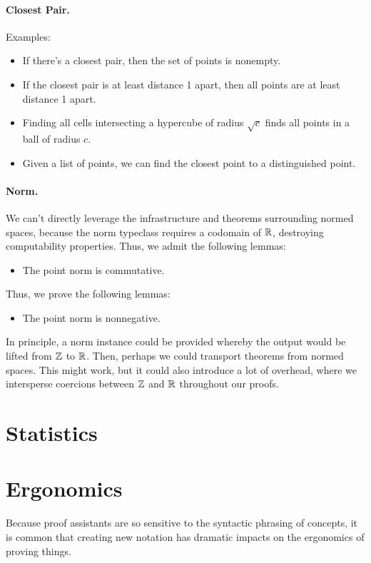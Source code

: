 \documentclass{article}
\begin{document}
\paragraph{Closest Pair.}
Examples:
\begin{itemize}
  \item If there's a closest pair, then the set of points is nonempty.
  \item If the closest pair is at least distance 1 apart, then all points are at least distance 1 apart.
  \item Finding all cells intersecting a hypercube of radius $\sqrt{c}$ finds all points in a ball of radius $c$.
  \item Given a list of points, we can find the closest point to a distinguished point.
\end{itemize}

\paragraph{Norm.}
We can't directly leverage the infrastructure and theorems surrounding normed spaces, because the norm typeclass requires a codomain of $\mathbb{R}$, destroying computability properties.
Thus, we admit the following lemmas:
\begin{itemize}
  \item The point norm is commutative.
\end{itemize}
Thus, we prove the following lemmas:
\begin{itemize}
  \item The point norm is nonnegative.
\end{itemize}
In principle, a norm instance could be provided whereby the output would be lifted from $\mathbb{Z}$ to $\mathbb{R}$.
Then, perhaps we could transport theorems from normed spaces.
This might work, but it could also introduce a lot of overhead, where we intersperse coercions between $\mathbb{Z}$ and $\mathbb{R}$ throughout our proofs.


\section{Statistics}

\section{Ergonomics}
Because proof assistants are so sensitive to the syntactic phrasing of concepts, it is common that creating new notation has dramatic impacts on the ergonomics of proving things.
\end{document}
